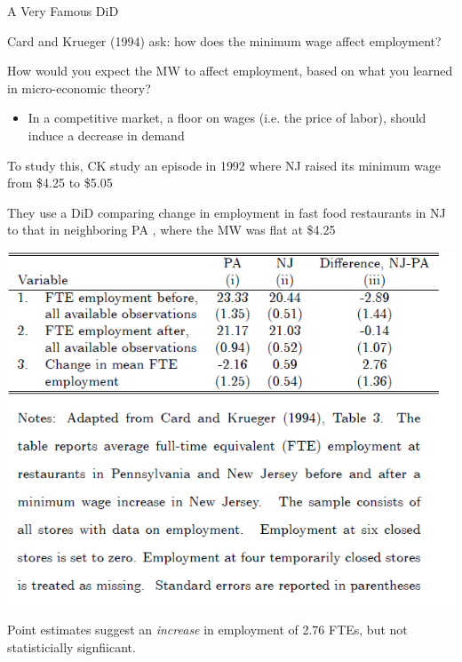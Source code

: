 \documentclass[11pt,english,handout]{beamer}
\newenvironment{wideitemize}{\itemize\addtolength{\itemsep}{10pt}}{\enditemize}
\begin{document}
\begin{frame}{A Very Famous DiD}
	\begin{wideitemize}
		\item
		Card and Krueger (1994) ask: how does the minimum wage affect employment? 
		
		\pause
		\item
		How would you expect the MW to affect employment, based on what you learned in micro-economic theory? 
		
		\pause
			\begin{itemize}
				\item 
				In a competitive market, a floor on wages (i.e. the price of labor), should induce a decrease in demand
			\end{itemize}
		
		\pause
		\item
		To study this, CK study an episode in 1992 where NJ raised its minimum wage from \$4.25 to \$5.05
		
		\pause
		\item
		They use a DiD comparing change in employment in fast food restaurants in NJ to that in neighboring PA , where the MW was flat at \$4.25
	\end{wideitemize}
\end{frame}


\begin{frame}
	\begin{center}
			\includegraphics[width = 0.7\linewidth]{CK_table}
	\end{center}
	\pause
	\begin{wideitemize}
		\item
		Point estimates suggest an \textit{increase} in employment of 2.76 FTEs, but not statisticially signfiicant. 
	\end{wideitemize}
\end{frame}
\end{document}
